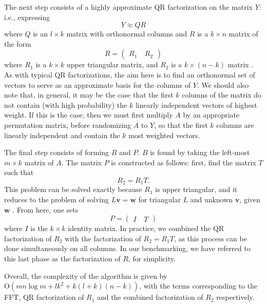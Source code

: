 \documentclass[11pt]{article}
\begin{document}
The next step consists of a highly approximate QR factorization on the matrix $Y$: i.e., expressing \begin{equation}
Y\approx QR
\end{equation}where  $Q$ is an $l\times k$ matrix with orthonormal columns and $R$ is a $k\times n$ matrix of the form \begin{equation}
R = \left(\begin{array}{cc} R_1 &\ R_2\end{array}\right)
\end{equation} where $R_1$ is a $k\times k$ upper triangular matrix, and $R_2$ is a $k\times(n-k)$ matrix \cite{cheng}.   As with typical QR factorizations, the aim here is to find an orthonormal set of vectors to serve as an approximate basis for the columns of $Y$.    We should also note that, in general, it may be the case that the first $k$ columns of the matrix do not contain (with high probability) the $k$ linearly independent vectors of highest weight.  If this is the case, then we must first multiply $A$  by an appropriate permutation matrix, before randomizing $A$ to $Y$, so that the first $k$ columns are linearly independent and contain the $k$ most weighted vectors.

The final step consists of forming $B$ and $P$.  $B$ is found by taking the left-most $m\times k$ matrix of $A$.  The matrix $P$ is constructed as follows: first, find the matrix $T$ such that \begin{equation}
R_2 = R_1T.
\end{equation}This problem can be solved exactly because $R_1$ is upper triangular, and it reduces to the problem of solving $L\mathbf{v} = \mathbf{w}$ for triangular $L$ and unknown $\mathbf{v}$, given $\mathbf{w}$ \cite{golub}.   From here, one sets \begin{equation}
P = \left(\begin{array}{cc} I &\ T \end{array}\right)
\end{equation}
where $I$ is the $k\times k$ identity matrix.  In practice, we combined the QR factorization of $R_2$ with the factorization of $R_2=R_1T$, as this process can be done simultaneously on all columns.   In our benchmarking, we have referred to this last phase as the factorization of $R$, for simplicity.

Overall, the complexity of the algorithm is given by $\mathrm{O}(mn\log m + lk^2 + k(l+k)(n-k))$, with the terms corresponding to the FFT, QR factorization of $R_1$ and the combined factorization of $R_2$ respectively.  
\end{document}
